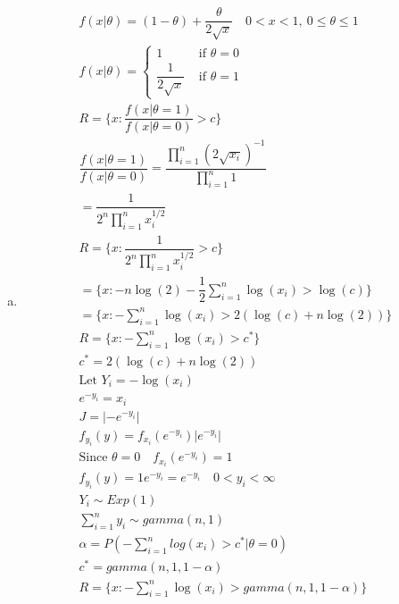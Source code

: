 \documentclass{article}
\newcommand{\sumn}{\sum_{i=1}^{n}}
\newcommand{\prodn}{\prod_{i=1}^{n}}
\newcommand{\ta}{\theta}
\begin{document}
\begin{flushleft}
\begin{enumerate}[(a)]
	
	\item 	
\begin{multline*}\\
f(x|\ta)=(1-\ta)+\dfrac{\ta}{2\sqrt{x}} \quad 0<x<1, \ 0\leq \ta \leq 1\\
f(x|\ta)=\begin{cases}
1  &\text{ if } \ta=0\\
\dfrac{1}{2\sqrt{x}} &\text{ if } \ta=1
\end{cases}\\
R=\{x:\dfrac{f(x|\ta=1)}{f(x|\ta=0)}>c\}\\
\dfrac{f(x|\ta=1)}{f(x|\ta=0)}=\dfrac{\prodn (2\sqrt{x_i})^{-1}}{\prodn 1}\\
=\dfrac{1}{2^n \prodn x_i^{1/2}}\\
R=\{x:\dfrac{1}{2^n \prodn x_i^{1/2}}>c\}\\
=\{x:-n\log(2)-\dfrac{1}{2}\sumn \log(x_i)>\log(c)\}\\
=\{x:-\sumn \log(x_i)>2(\log(c)+n\log(2))\}\\
R=\{x:-\sumn \log(x_i)>c^*\}\\
c^*=2(\log(c)+n\log(2))\\
\text{Let } Y_i=-\log(x_i)\\
e^{-y_i}=x_i\\
J=|-e^{-y_i}|\\
f_{y_i}(y)=f_{x_i}(e^{-y_i})|e^{-y_i}|\\
\text{Since } \ta=0 \quad f_{x_i}(e^{-y_i})=1\\
f_{y_i}(y)=1e^{-y_i}=e^{-y_i} \quad 0<y_i<\infty\\
Y_i\sim Exp(1)\\
\sumn y_i \sim gamma(n,1)\\
\alpha=P(-\sumn log(x_i)>c^*|\ta=0)\\
c^*=gamma(n,1,1-\alpha)\\
R=\{x:-\sumn \log(x_i)>gamma(n,1,1-\alpha) \}\\
\end{multline*}


\end{enumerate}
\end{flushleft}
\end{document}
